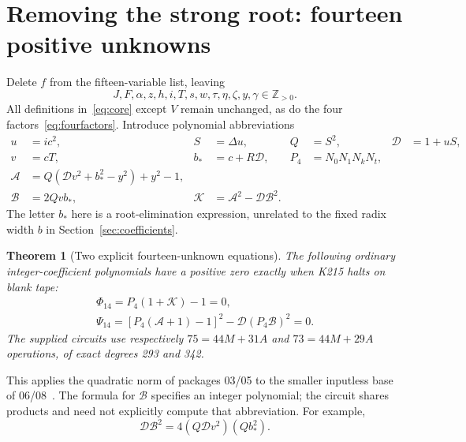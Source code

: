 \documentclass[11pt,a4paper]{article}
\newtheorem{theorem}{Theorem}[section]
\theoremstyle{remark}\newtheorem{remark}[theorem]{Remark}
\newcommand{\Pos}{\mathbb Z_{>0}}
\begin{document}
\section{Removing the strong root: fourteen positive unknowns}\label{sec:root14}

Delete \(f\) from the fifteen-variable list, leaving
\[
 J,F,\alpha,z,h,i,T,s,w,\tau,\eta,\zeta,y,\gamma\in\Pos.
\]
All definitions in~\eqref{eq:core} except \(V\) remain unchanged, as do
the four factors~\eqref{eq:fourfactors}. Introduce polynomial abbreviations
\begin{align}
 u&=ic^2,& S&=\Delta u,&Q&=S^2,&\mathcal D&=1+uS,\nonumber\\
 v&=cT,& b_*&=c+R\mathcal D,& P_4&=N_0N_1N_kN_t,\label{eq:rootdata}\\
 \mathcal A&=Q(\mathcal Dv^2+b_*^2-y^2)+y^2-1,\nonumber\\
 \mathcal B&=2Qvb_*,&\mathcal K&=\mathcal A^2-\mathcal D\mathcal B^2.\nonumber
\end{align}
The letter \(b_*\) here is a root-elimination expression, unrelated to the
fixed radix width \(b\) in Section~\ref{sec:coefficients}.

\begin{theorem}[Two explicit fourteen-unknown equations]\label{thm:root14}
The following ordinary integer-coefficient polynomials have a positive
zero exactly when K215 halts on blank tape:
\begin{align}
 \boxed{\Phi_{14}=P_4(1+\mathcal K)-1=0},\label{eq:phi14}\\
 \boxed{\Psi_{14}=[P_4(\mathcal A+1)-1]^2
                   -\mathcal D(P_4\mathcal B)^2=0}.\label{eq:psi14}
\end{align}
The supplied circuits use respectively \(75=44M+31A\) and
\(73=44M+29A\) operations, of exact degrees 293 and 342.
\end{theorem}

This applies the quadratic norm of packages 03/05 to the smaller inputless
base of 06/08~\cite{src05,src06,src08}. The formula for \(\mathcal B\) specifies an integer
polynomial; the circuit shares products and need not explicitly compute
that abbreviation. For example,
\[
 \mathcal D\mathcal B^2=4(Q\mathcal Dv^2)(Qb_*^2).
\]
\end{document}
